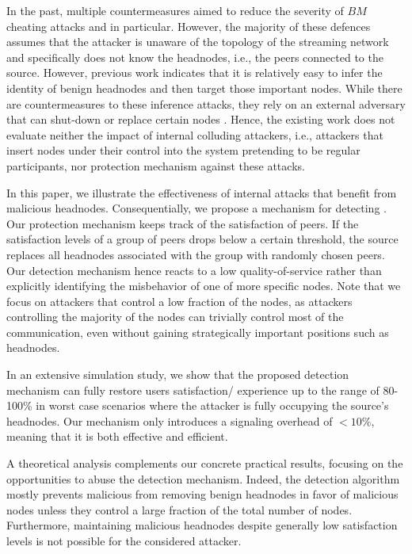 In the past, multiple countermeasures aimed to reduce the severity of $BM$ cheating attacks and \drop in particular. However, the majority of these defences \cite{zhang2005coolstreaming, defending2, antiliar} assumes that the attacker is unaware of the topology of the streaming network and specifically does not know the headnodes, i.e., the peers connected to the source. 
However, previous work indicates that it is relatively easy to infer the identity of benign headnodes and then target those important nodes. 
While there are countermeasures to these inference attacks, they rely on an external adversary that can shut-down or replace certain nodes \cite{nguyen2016swap, rbcs, nguyen2014resilience}. Hence, the existing work does not evaluate neither the impact of internal colluding attackers, i.e., attackers that insert nodes under their control into the system pretending to be regular participants, nor protection mechanism against these attacks. 


In this paper, we  illustrate the effectiveness of internal attacks that benefit from malicious headnodes. 
Consequentially, we propose a mechanism for detecting \drop. Our protection mechanism keeps track of the satisfaction of peers. If the satisfaction levels of a group of peers drops below a certain threshold, the source replaces all headnodes associated with the group with randomly chosen peers. Our detection mechanism hence reacts to a low quality-of-service rather than explicitly identifying the misbehavior of one of more specific nodes.
Note that we focus on attackers that control a low fraction of the nodes, as attackers controlling the majority of the nodes can trivially control most of the communication, even without gaining strategically important positions such as headnodes.    

In an extensive simulation study, we show that the proposed detection mechanism can fully restore users satisfaction/ experience up to the range of 80-100\% in worst case scenarios where the attacker is fully occupying the source's headnodes. 
Our mechanism only introduces a signaling overhead of $<10\%$, meaning that it is both effective and efficient.

A theoretical analysis complements our concrete practical results, focusing on the opportunities to abuse the detection mechanism. 
Indeed, the detection algorithm mostly prevents malicious from removing benign headnodes in favor of malicious nodes unless they control a large fraction of the total number of nodes. 
Furthermore, maintaining malicious headnodes despite generally low satisfaction levels is not possible for the considered attacker. 
  




